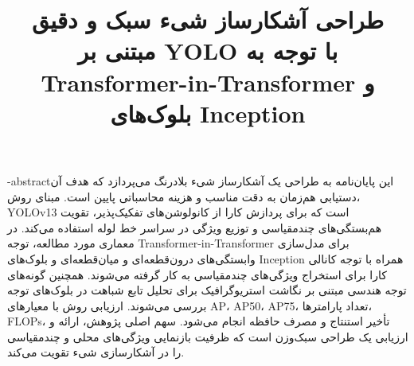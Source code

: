 \title{طراحی آشکارساز شیء سبک و دقیق مبتنی بر YOLO با توجه به Transformer-in-Transformer و بلوک‌های Inception}
\fa-abstract{این پایان‌نامه به طراحی یک آشکارساز شیء بلادرنگ می‌پردازد که هدف آن دستیابی هم‌زمان به دقت مناسب و هزینه محاسباتی پایین است. مبنای روش، YOLOv13 است که برای پردازش کارا از کانولوشن‌های تفکیک‌پذیر، تقویت هم‌بستگی‌های چندمقیاسی و توزیع ویژگی در سراسر خط لوله استفاده می‌کند. در معماری مورد مطالعه، توجه Transformer-in-Transformer برای مدل‌سازی وابستگی‌های درون‌قطعه‌ای و میان‌قطعه‌ای و بلوک‌های Inception همراه با توجه کانالی کارا برای استخراج ویژگی‌های چندمقیاسی به کار گرفته می‌شوند. همچنین گونه‌های توجه هندسی مبتنی بر نگاشت استریوگرافیک برای تحلیل تابع شباهت در بلوک‌های توجه بررسی می‌شوند. ارزیابی روش با معیارهای AP، AP50، AP75، تعداد پارامترها، FLOPs، تأخیر استنتاج و مصرف حافظه انجام می‌شود. سهم اصلی پژوهش، ارائه و ارزیابی یک طراحی سبک‌وزن است که ظرفیت بازنمایی ویژگی‌های محلی و چندمقیاسی را در آشکارسازی شیء تقویت می‌کند.}
\vtitle
